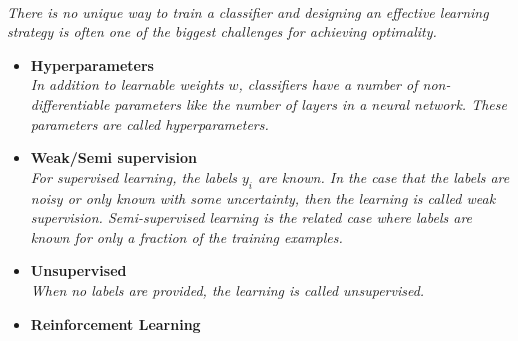 \documentclass[12pt,letterpaper]{article}
\begin{document}
\begin{itemize}
\begin{itemize}
		\\\textit{There is no unique way to train a classifier and designing an effective learning strategy is often one of the biggest challenges for achieving optimality.}
			\begin{itemize}
				\item \textbf{Hyperparameters}~\cite{Glowacki:2026snv,Bardhan:2024ibw,Allaire:2023dfg,Schroff:2023see,DeZoort:2023dvb,Bevan:2017stx,Dudko:2021cie,Tani:2020dyi}
				\\\textit{In addition to learnable weights $w$, classifiers have a number of non-differentiable parameters like the number of layers in a neural network.  These parameters are called hyperparameters.}
				\item \textbf{Weak/Semi supervision}~\cite{Amaro:2026vga,Bhargava:2025xig,Chen:2025vpa,Rieck:2025xnh,Chen:2024nvc,Lieberman:2024hga,Beauchesne:2023vie,Witkowski:2023htt,Bardhan:2023mia,Dolan:2022ikg,LeBlanc:2022bwd,Finke:2022lsu,Li:2022omf,Komiske:2022vxg,Lieberman:2021krq,Lee:2019ssx,Dahbi:2020zjw,Brewer:2020och,Amram:2020ykb,collaboration2020dijet,Metodiev:2018ftz,Komiske:2018vkc,Cohen:2017exh,Borisyak:2019vbz,Collins:2019jip,Collins:2018epr,Komiske:2018oaa,Metodiev:2017vrx,Dery:2017fap}
				\\\textit{For supervised learning, the labels $y_i$ are known.  In the case that the labels are noisy or only known with some uncertainty, then the learning is called weak supervision.  Semi-supervised learning is the related case where labels are known for only a fraction of the training examples.}
				\item \textbf{Unsupervised}~\cite{Parker:2026ywx,Marriott-Clarke:2026zyc,Amaro:2026vga,Tsoi:2026rnt,DeGraw:2025elg,Lv:2025nvq,Abdelhaq:2025nch,Chowdhury:2025mul,Coradin:2025ees,Katel:2024ygn,Sheldon:2024sbe,Cai:2024xnt,Lu:2024ict,Kishimoto:2023cys,Badea:2023jdb,Kitouni:2023rct,Huang:2023kgs,Dillon:2021gag,Howard:2021pos,Cai:2020vzx,Dillon:2019cqt,1797846,Komiske:2019fks,Mackey:2015hwa}
                                  \\\textit{When no labels are provided, the learning is called unsupervised.}
				\item \textbf{Reinforcement Learning}~\cite{Ibrahim:2026imt,Adriamirado:2026rvn,Alexander:2026lpw,deSouza:2026sta,Zoccheddu:2026cjr,Giarnetti:2025mit,Mendizabal:2025sbf,Dillon:2025dxr,Baretz:2025zsv,Zeng:2025xbh,Nishimura:2024apb,Angloher:2023oya,Alvestad:2023jgl,Nishimura:2023wdu,Dersy:2022bym,Windisch:2021mem,Cranmer:2021gdt,Harvey:2021oue,John:2020sak,Brehmer:2020brs,Carrazza:2019efs, Kumar:2026zpo}

\end{itemize}
\end{itemize}
\end{itemize}
\end{document}
